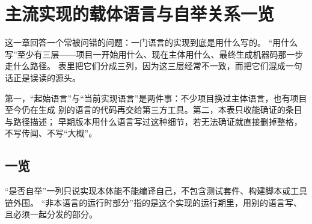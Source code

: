 \documentclass[12pt,a4paper,fontset=fandol]{ctexbook}
\begin{document}
\chapter{主流实现的载体语言与自举关系一览}\label{ap:clC-selfhost}

这一章回答一个常被问错的问题：一门语言的实现到底是用什么写的。
“用什么写”至少有三层——项目一开始用什么、现在主体用什么、最终生成机器码那一步走什么路径。
表里把它们分成三列，因为这三层经常不一致，而把它们混成一句话正是误读的源头。

\begin{note}[title=读这张表的两个规则]
第一，“起始语言”与“当前实现语言”是两件事：不少项目换过主体语言，也有项目至今仍在生成
别的语言的代码再交给第三方工具。第二，本表只收能确证的条目与路径描述；
早期版本用什么语言写过这种细节，若无法确证就直接删掉整格，不写传闻、不写“大概”。
\end{note}

\section{一览}

“是否自举”一列只说实现本体能不能编译自己，不包含测试套件、构建脚本或工具链外围。
“非本语言的运行时部分”指的是这个实现的运行期里，用别的语言写、且必须一起分发的部分。
\end{document}

